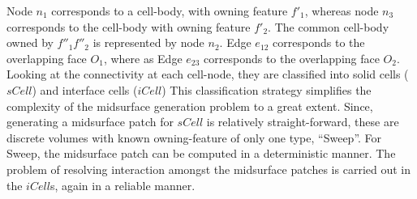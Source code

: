 Node $n_1$ corresponds to a cell-body, with owning feature $f'_1$, whereas node $n_3$ corresponds to the cell-body with owning feature $f'_2$. The common cell-body owned by $ f''_1f''_2$ is represented by node $n_2$.  Edge $e_{12}$ corresponds to the overlapping face $O_1$, where as  Edge $e_{23}$ corresponds to the overlapping face $O_2$.
Looking at the connectivity at each cell-node, they are classified into solid cells ($sCell$) and interface cells ($iCell$)  %
This classification strategy simplifies the complexity of the midsurface generation problem to a great extent. Since, generating a midsurface patch for $sCell$  is relatively straight-forward, these are discrete volumes with known owning-feature of only one type, ``Sweep''. For Sweep, the midsurface patch can be computed in a deterministic manner. The problem of resolving interaction amongst the midsurface patches is carried out in the $iCell$s, again in a reliable manner.
%
%

%
%
				
